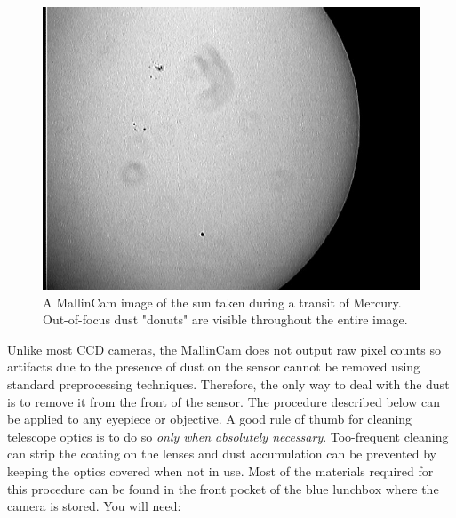 \documentclass[12pt,titlepage]{article}
\begin{document}
\begin{figure}[H] 
	\begin{center}
		\includegraphics[width=.95\textwidth]{./images/MallinCam/dust/mercury_transit.jpg} 
		\caption{A MallinCam image of the sun taken during a transit of Mercury.
		Out-of-focus dust "donuts" are visible throughout the entire image.}
		\label{sundust}
	\end{center}
\end{figure}

Unlike most CCD cameras, the MallinCam does not output raw pixel counts so artifacts due to the presence of dust on the sensor cannot be removed using standard preprocessing techniques.
Therefore, the only way to deal with the dust is to remove it from the front of the sensor.
The procedure described below can be applied to any eyepiece or objective.
A good rule of thumb for cleaning telescope optics is to do so \textit{only when absolutely necessary}.
Too-frequent cleaning can strip the coating on the lenses and dust accumulation can be prevented by keeping the optics covered when not in use.
Most of the materials required for this procedure can be found in the front pocket of the blue lunchbox where the camera is stored.
You will need:
\end{document}
